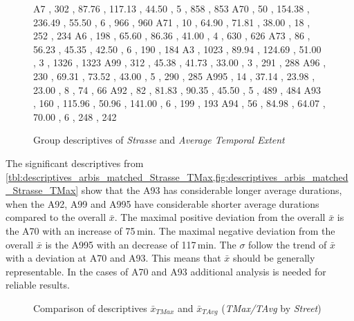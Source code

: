 \begin{figure}[ht!]
\begin{minipage}{0.55\textwidth}
{			A7   , 302  , 87.76  , 117.13 , 44.50  , 5  , 858  , 853  
			A70  , 50   , 154.38 , 236.49 , 55.50  , 6  , 966  , 960  
			A71  , 10   , 64.90  , 71.81  , 38.00  , 18 , 252  , 234  
			A6   , 198  , 65.60  , 86.36  , 41.00  , 4  , 630  , 626  
			A73  , 86   , 56.23  , 45.35  , 42.50  , 6  , 190  , 184  
			A3   , 1023 , 89.94  , 124.69 , 51.00  , 3  , 1326 , 1323 
			A99  , 312  , 45.38  , 41.73  , 33.00  , 3  , 291  , 288  
			A96  , 230  , 69.31  , 73.52  , 43.00  , 5  , 290  , 285  
			A995 , 14   , 37.14  , 23.98  , 23.00  , 8  , 74   , 66 
			A92  , 82   , 81.83  , 90.35  , 45.50  , 5  , 489  , 484  
			A93  , 160  , 115.96 , 50.96  , 141.00 , 6  , 199  , 193  
			A94  , 56   , 84.98  , 64.07  , 70.00  , 6  , 248  , 242  
		}\data
		\pgfplotstablesort[sort key=mean, sort cmp=float >]{\datasorted}{\data}
		\tiny
		\centering
		\label{fig:descriptives_arbis_matched_Strasse_TAvg}
	\end{minipage}%
	\caption{Group descriptives of \textit{Strasse} and \textit{Average Temporal Extent}}
\end{figure}
The significant descriptives from \cref{tbl:descriptives_arbis_matched_Strasse_TMax,fig:descriptives_arbis_matched_Strasse_TMax} show that the A93 has considerable longer average durations, when the A92, A99 and A995 have considerable shorter average durations compared to the overall $\bar{x}$. The maximal positive deviation from the overall $\bar{x}$ is the A70 with an increase of 75\,min. The maximal negative deviation from the overall $\bar{x}$ is the A995 with an decrease of 117\,min. The $\sigma$ follow the trend of $\bar{x}$ with a deviation at A70 and A93. This means that $\bar{x}$ should be generally representable. In the cases of A70 and A93 additional analysis is needed for reliable results.
\begin{figure}[ht!]
	\data
	\pgfplotstablesort[sort key=meanTAvg, sort cmp=float >]{\datasorted}{\data}
	\tiny
	\centering
	\caption{Comparison of descriptives $\bar{x}_{TMax}$ and $\bar{x}_{TAvg}$ (\textit{TMax/TAvg} by \textit{Street})}
	\label{fig:arbis_matched_meancomparison_Str_temporal}
\end{figure}
